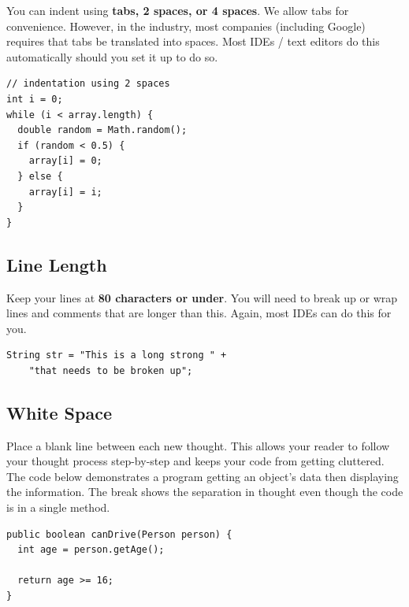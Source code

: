\documentclass[10pt,DIV=23,landscape]{scrartcl}
\begin{document}
\begin{paracol}{2}
\begin{leftcolumn}
You can indent using \textbf{tabs, 2 spaces, or 4 spaces}. We allow tabs
for convenience. However, in the industry, most companies (including
Google) requires that tabs be translated into spaces. Most IDEs / text
editors do this automatically should you set it up to do so.
\end{leftcolumn}

\begin{rightcolumn}
\begin{lstlisting}
// indentation using 2 spaces
int i = 0;
while (i < array.length) {
  double random = Math.random();
  if (random < 0.5) {
    array[i] = 0;
  } else {
    array[i] = i;
  }
}
\end{lstlisting}
\end{rightcolumn}
\end{paracol}

\subsection{Line Length}\label{line-length}

\begin{paracol}{2}
\begin{leftcolumn}
Keep your lines at \textbf{80 characters or under}. You will need to
break up or wrap lines and comments that are longer than this. Again,
most IDEs can do this for you.
\end{leftcolumn}

\begin{rightcolumn}
\begin{lstlisting}
String str = "This is a long strong " +
    "that needs to be broken up";
\end{lstlisting}
\end{rightcolumn}
\end{paracol}

\subsection{White Space}\label{white-space}

\begin{paracol}{2}
\begin{leftcolumn}
Place a blank line between each new thought. This allows your reader to
follow your thought process step-by-step and keeps your code from
getting cluttered. The code below demonstrates a program getting an
object's data then displaying the information. The break shows the
separation in thought even though the code is in a single method.
\end{leftcolumn}

\begin{rightcolumn}
\begin{lstlisting}
public boolean canDrive(Person person) {
  int age = person.getAge();

  return age >= 16;
}
\end{lstlisting}
\end{rightcolumn}
\end{paracol}
\end{document}
